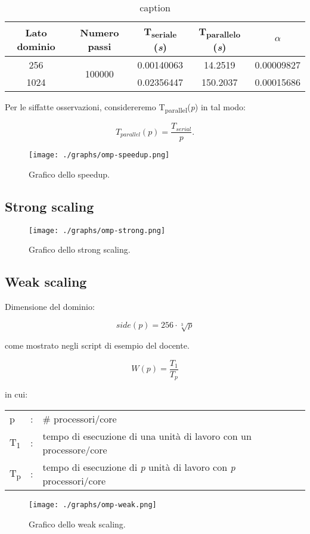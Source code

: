 \begin{table}[ht]
\begin{tabular}{ccccc}
\toprule
 Lato dominio & Numero passi & T\textsubscript{seriale} (\textit{s}) &
 T\textsubscript{parallelo} (\textit{s})& $\alpha$ \\
 \midrule
    256 & \multirow{2}{*}{100000} & 0.00140063 & 14.2519 & 0.00009827 \\
    1024 & & 0.02356447 & 150.2037 & 0.00015686 \\
\bottomrule
\end{tabular}
\caption{caption}
\end{table}

Per le siffatte osservazioni, considereremo
T\textsubscript{parallel}(\textit{p}) in tal modo:

\[
T_{parallel}(p) = \frac{T_{serial}}{p}.
\]

\begin{figure}[h!]
  \centering
  \texttt{[image: ./graphs/omp-speedup.png]}
  \caption{Grafico dello speedup.}\label{fig:speedup1}
\end{figure}

\newpage

\subsection{Strong scaling}

\begin{figure}[h!]
  \centering
  \texttt{[image: ./graphs/omp-strong.png]}
  \caption{Grafico dello strong scaling.}\label{fig:strong1}
\end{figure}

\subsection{Weak scaling}

Dimensione del dominio:

\[
side(p) = 256 \cdot \sqrt[3]{p}
\]

come mostrato negli script di esempio del docente.

\[
W(p) = \frac{T_{1}}{T_{p}}
\]

in cui:
\begin{table}[ht]
\begin{tabular}{lll}
    p &: & \# processori/core\\
    T\textsubscript{1}&: & tempo di esecuzione di una unità di lavoro con un
    processore/core\\
    T\textsubscript{p}&: & tempo di esecuzione di \textit{p} unità di lavoro con
    \textit{p} processori/core
\end{tabular}
\end{table}

\begin{figure}[h!]
  \centering
  \texttt{[image: ./graphs/omp-weak.png]}
  \caption{Grafico dello weak scaling.}\label{fig:weak1}
\end{figure}
